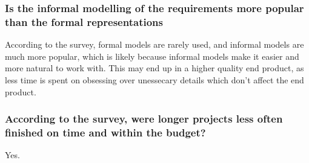 \documentclass[letterpaper,12pt]{article}
\begin{document}
\subsubsection{Is the informal modelling of the requirements more
 popular than the formal representations}

According to the survey, formal models are rarely used, and informal models are
much more popular, which is likely because informal models make it easier and more
natural to work with. This may end up in a higher quality end product, as less time
is spent on obsessing over unessecary details which don't affect the end product.
\subsubsection{According to the survey, were longer projects less often finished on
 time and within the budget?}
Yes.
\end{document}
